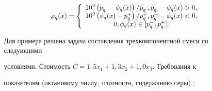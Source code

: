 \documentclass [12pt]{article}
\begin{document}
\[

\varphi _q (x) = \left\{ {{\begin{array}{*{20}c}

 {10^2\left( {p_q^ - - \phi _q (x)} \right) / p_q^ - ,p_q^ - - \phi _q (x) > 

0,} \\

 {10^2\left( {\phi _q (x) - p_q^ + } \right) / p_q^ + ,p_q^ + - \phi _q (x) 

< 0,} \\

 {0,\phi _q (x) \in [p_q^ - ,p_q^ + ].} \\

\end{array} }} \right.

\]















Для примера решена задача составления трехкомпонентной смеси со следующими 

условиями. Стоимость $C = 1,5x_1 + 1,3x_2 + 1,0x_3 $. Требования к 

показателям (октановому числу, плотности, содержанию серы) : 
\end{document}
